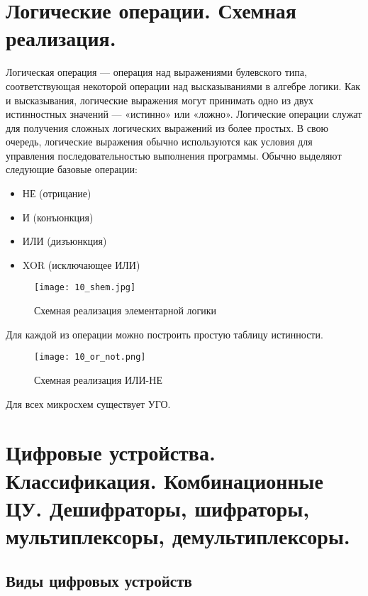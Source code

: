 \section{Логические операции. Схемная реализация.}

Логическая операция --- операция над выражениями булевского типа, соответствующая некоторой операции над высказываниями в алгебре логики. Как и высказывания, логические выражения могут принимать одно из двух истинностных значений --- «истинно» или «ложно». Логические операции служат для получения сложных логических выражений из более простых. В свою очередь, логические выражения обычно используются как условия для управления последовательностью выполнения программы.
Обычно выделяют следующие базовые операции:

\begin{itemize}
\item НЕ (отрицание)
\item И (конъюнкция)
\item ИЛИ (дизъюнкция)
\item XOR (исключающее ИЛИ)
\end{itemize}

\begin{figure}[H]
\centering
\texttt{[image: 10\_shem.jpg]}
\caption{Схемная реализация элементарной логики}
\label{fig:10_shem}
\end{figure}

Для каждой из операции можно построить простую таблицу истинности.

\begin{figure}[H]
\centering
\texttt{[image: 10\_or\_not.png]}
\caption{Схемная реализация ИЛИ-НЕ}
\label{fig:10_or_not}
\end{figure}

Для всех микросхем существует УГО.


\section{Цифровые устройства. Классификация. Комбинационные ЦУ. Дешифраторы, шифраторы, мультиплексоры, демультиплексоры.}

\subsection*{Виды цифровых устройств}

